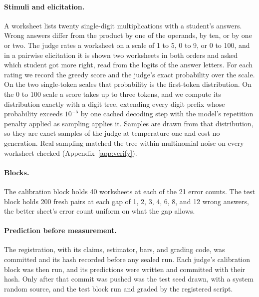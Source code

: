 \documentclass{article}
\theoremstyle{definition}
\theoremstyle{remark}
\begin{document}
\paragraph{Stimuli and elicitation.}
A worksheet lists twenty single-digit multiplications with a student's answers.
Wrong answers differ from the product by one of the operands, by ten, or by one or two.
The judge rates a worksheet on a scale of 1 to 5, 0 to 9, or 0 to 100, and in a pairwise elicitation it is shown two worksheets in both orders and asked which student got more right, read from the logits of the answer letters.
For each rating we record the greedy score and the judge's exact probability over the scale.
On the two single-token scales that probability is the first-token distribution.
On the 0 to 100 scale a score takes up to three tokens, and we compute its distribution exactly with a digit tree, extending every digit prefix whose probability exceeds $10^{-5}$ by one cached decoding step with the model's repetition penalty applied as sampling applies it.
Samples are drawn from that distribution, so they are exact samples of the judge at temperature one and cost no generation.
Real sampling matched the tree within multinomial noise on every worksheet checked (Appendix~\ref{app:verify}).

\paragraph{Blocks.}
The calibration block holds 40 worksheets at each of the 21 error counts.
The test block holds 200 fresh pairs at each gap of 1, 2, 3, 4, 6, 8, and 12 wrong answers, the better sheet's error count uniform on what the gap allows.

\paragraph{Prediction before measurement.}
The registration, with its claims, estimator, bars, and grading code, was committed and its hash recorded before any sealed run.
Each judge's calibration block was then run, and its predictions were written and committed with their hash.
Only after that commit was pushed was the test seed drawn, with a system random source, and the test block run and graded by the registered script.
\end{document}
